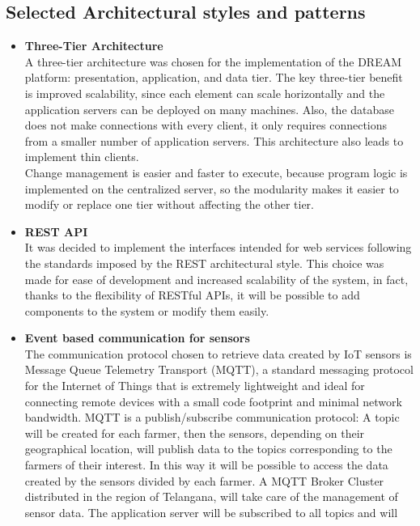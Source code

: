 \documentclass[10pt]{article} %
\begin{document}
\subsection{Selected Architectural styles and patterns}
\begin{itemize}
    \item \textbf{Three-Tier Architecture}\\A three-tier architecture was chosen for the 
    implementation of the DREAM platform: presentation, application, and data tier. 
    The key three-tier benefit is improved scalability, since each element
    can scale horizontally and the application servers can be deployed on many machines. 
    Also, the database does not make connections with every client, it only requires 
    connections from a smaller number of application servers. This architecture also leads to 
    implement thin clients. \\
    Change management is easier and faster to execute, because program logic
     is implemented on the centralized server, so the modularity makes it easier to modify 
     or replace one tier without affecting the other tier.
    \item \textbf{REST API}\\It was decided to implement the interfaces intended for web services 
    following the standards imposed by the REST architectural style. This choice was made for ease 
    of development and increased scalability of the system, in fact, thanks to the flexibility of 
    RESTful APIs, it will be possible to add components to the system or modify them easily.   
    \item \textbf{Event based communication for sensors}\\The communication protocol chosen to retrieve 
    data created by IoT sensors is Message Queue Telemetry Transport (MQTT), a standard messaging 
    protocol for the Internet of Things that is extremely lightweight and ideal for connecting remote 
    devices with a small code footprint and minimal network bandwidth. MQTT is a publish/subscribe 
    communication protocol: A topic will be created for each farmer, then the sensors, depending on 
    their geographical location, will publish data to the topics corresponding to the farmers of 
    their interest. In this way it will be possible to access the data created by the sensors divided 
    by each farmer. A MQTT Broker Cluster distributed in the region of Telangana, will take care of 
    the management of sensor data. The application server will be subscribed to all topics and will 

\end{itemize}
\end{document}
